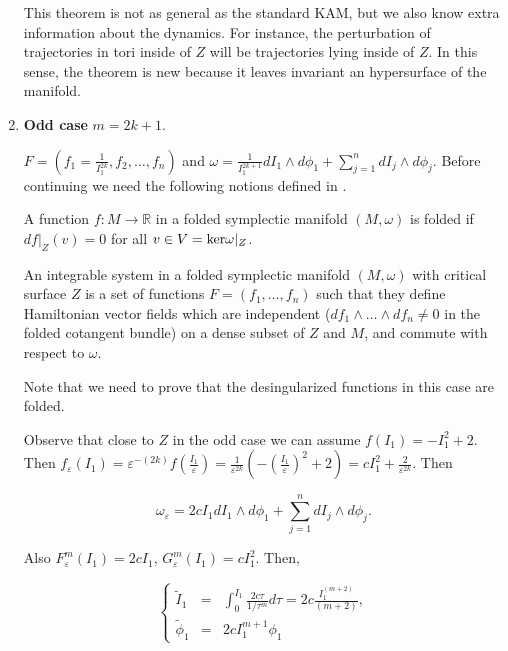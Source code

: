 \begin{enumerate}
\begin{remark} This theorem is not as general as the standard KAM, but we also know extra information about the dynamics. For instance, the perturbation of trajectories in tori inside of $Z$ will be trajectories lying inside of $Z$. In this sense, the theorem is new because it leaves invariant an hypersurface of the manifold.
\end{remark}

\item \textbf{Odd case} $m = 2k+1$.

$F = (f_1 = \frac{1}{I_1^{2k}}, f_2,\ldots,f_n)$ and $\omega = \frac{1}{I_1^{2k+1}} dI_1 \wedge d\phi_1 + \sum_{j=1}^n dI_j\wedge d \phi_j$.
Before continuing we need the following notions defined in \cite{EvaRobert}.

\begin{definition}
A function $f:M\rightarrow \mathbb{R}$ in a folded symplectic manifold $(M,\omega)$ is folded if $df|_Z(v)=0$ for all $v\in V=\textup{ker}\omega|_Z$.
\end{definition}

\begin{definition}
An integrable system in a folded symplectic manifold $(M,\omega)$ with critical surface $Z$ is a set of functions $F =(f_1,\ldots,f_n)$ such that they define Hamiltonian vector fields which are independent ($df_1\wedge \ldots \wedge d f_n \neq 0$ in the folded cotangent bundle) on a dense subset of $Z$ and $M$, and commute with respect to $\omega$.
\end{definition}

Note that we need to prove that the desingularized functions in this case are folded.

Observe that close to $Z$ in the odd case we can assume $f(I_1) = -I_1^2 + 2$. Then $f_\varepsilon(I_1) = \varepsilon^{-(2k)} f(\frac{I_1}{\varepsilon}) = \frac{1}{\varepsilon^{2k}}(-(\frac{I_1}{\varepsilon})^2 + 2) = c I_1^2 + \frac{2}{\varepsilon^{2k}}$. Then

$$\omega_\varepsilon = 2cI_1 dI_1 \wedge d\phi_1 + \sum_{j=1}^n dI_j \wedge d\phi_j.$$

Also $F_\varepsilon^m(I_1) = 2c I_1$, $G_\varepsilon^m(I_1) = cI_1^2$. Then,

$$
\left\{
\begin{array}{rcl}
\tilde I_1 & = & \int_0^{I_1}\frac{2 c \tau}{1/\tau^m} d\tau = 2c \frac{I_1^{(m+2)}}{(m+2)},\\
\tilde \phi_1 & = & 2c I_1^{m+1}\phi_1
\end{array}
\right.
$$


\end{enumerate}
